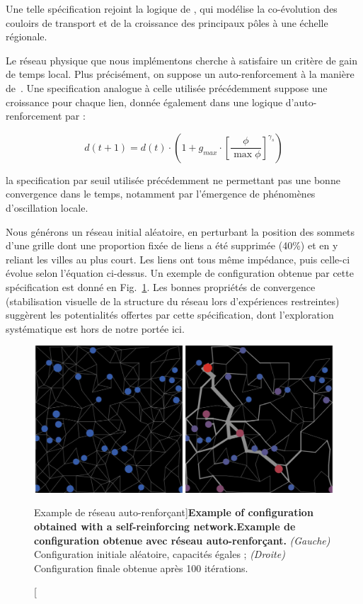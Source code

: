 Une telle spécification rejoint la logique de \cite{li2014modeling}, qui modélise la co-évolution des couloirs de transport et de la croissance des principaux pôles à une échelle régionale.

Le réseau physique que nous implémentons cherche à satisfaire un critère de gain de temps local. Plus précisément, on suppose un auto-renforcement à la manière de~\cite{tero2010rules}. Une specification analogue à celle utilisée précédemment suppose une croissance pour chaque lien, donnée également dans une logique d'auto-renforcement par :

\[
d(t+1) = d(t)\cdot \left(1 + g_{max} \cdot \left[\frac{\phi}{\max \phi}\right]^{\gamma_s}\right)
\]

la specification par seuil utilisée précédemment ne permettant pas une bonne convergence dans le temps, notamment par l'émergence de phénomènes d'oscillation locale.

Nous générons un réseau initial aléatoire, en perturbant la position des sommets d'une grille dont une proportion fixée de liens a été supprimée (40\%) et en y reliant les villes au plus court. Les liens ont tous même impédance, puis celle-ci évolue selon l'équation ci-dessus. Un exemple de configuration obtenue par cette spécification est donné en Fig.~\ref{fig:macrocoevolution:slimemould}. Les bonnes propriétés de convergence (stabilisation visuelle de la structure du réseau lors d'expériences restreintes) suggèrent les potentialités offertes par cette spécification, dont l'exploration systématique est hors de notre portée ici.


\begin{figure}
	\includegraphics[width=\linewidth]{Figures/Final/6-2-3-fig-macrocoevol-slimemould}
	\caption[Example of self-reinforcing network][Example de réseau auto-renforçant]{\textbf{Example of configuration obtained with a self-reinforcing network.}\label{fig:macrocoevolution:slimemould}}{\textbf{Example de configuration obtenue avec réseau auto-renforçant.} \textit{(Gauche)} Configuration initiale aléatoire, capacités égales ; \textit{(Droite)} Configuration finale obtenue après 100 itérations.\label{fig:macrocoevolution:slimemould}}
\end{figure}


